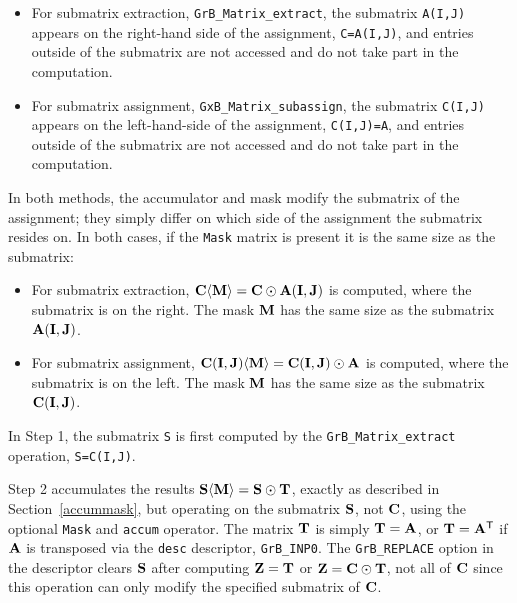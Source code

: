 \documentclass[12pt]{article}
\begin{document}
\begin{itemize}
\item
For submatrix extraction, \verb'GrB_Matrix_extract',
the submatrix \verb'A(I,J)' appears on the right-hand side of the assignment,
\verb'C=A(I,J)', and entries outside of the submatrix are not accessed and do
not take part in the computation.

\item
For submatrix assignment, \verb'GxB_Matrix_subassign',
the submatrix \verb'C(I,J)' appears on the left-hand-side of the assignment,
\verb'C(I,J)=A', and entries outside of the submatrix are not accessed and do
not take part in the computation.

\end{itemize}

In both methods, the accumulator and mask modify the submatrix of the
assignment; they simply differ on which side of the assignment the submatrix
resides on.  In both cases, if the \verb'Mask' matrix is present it is the same
size as the submatrix:

\begin{itemize}

\item
For submatrix extraction,
${\bf C \langle M \rangle = C \odot A(I,J)}$ is computed,
where the submatrix is on the right.
The mask ${\bf M}$ has the same size as the submatrix ${\bf A(I,J)}$.

\item
For submatrix assignment,
${\bf C(I,J) \langle M \rangle = C(I,J) \odot A}$ is computed,
where the submatrix is on the left.
The mask ${\bf M}$ has the same size as the submatrix ${\bf C(I,J)}$.

\end{itemize}

In Step 1, the submatrix \verb'S' is first computed by the
\verb'GrB_Matrix_extract' operation, \verb'S=C(I,J)'.

Step 2 accumulates the results ${\bf S \langle M \rangle  = S \odot T}$,
exactly as described in Section~\ref{accummask}, but operating on the submatrix
${\bf S}$, not ${\bf C}$, using the optional \verb'Mask' and \verb'accum'
operator.  The matrix ${\bf T}$ is simply ${\bf T}={\bf A}$, or ${\bf T}={\bf
A}^{\sf T}$ if ${\bf A}$ is transposed via the \verb'desc' descriptor,
\verb'GrB_INP0'.  The \verb'GrB_REPLACE' option in the descriptor clears ${\bf
S}$ after computing ${\bf Z = T}$ or ${\bf Z = C \odot T}$, not all of ${\bf
C}$ since this operation can only modify the specified submatrix of ${\bf C}$.
\end{document}
